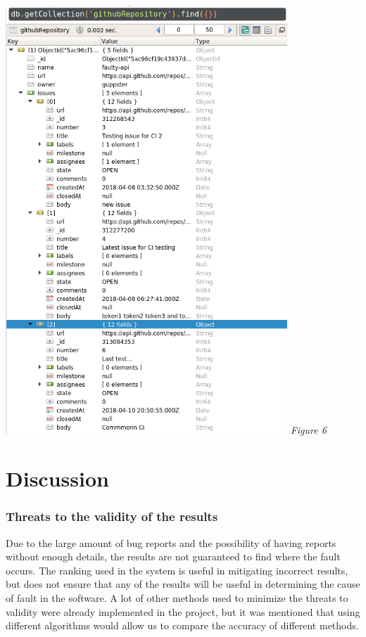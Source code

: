 \documentclass[12pt]{article}
\begin{document}
\includegraphics[width=400px]{../images/Robo3t} \emph{Figure 6}

\section{Discussion}\label{discussion}

\subsubsection{Threats to the validity of the
results}\label{threats-to-the-validity-of-the-results}

Due to the large amount of bug reports and the possibility of having
reports without enough details, the results are not guaranteed to find
where the fault occurs. The ranking used in the system is useful in
mitigating incorrect results, but does not ensure that any of the
results will be useful in determining the cause of fault in the
software. A lot of other methods used to minimize the threats to
validity were already implemented in the project, but it was mentioned
that using different algorithms would allow us to compare the accuracy
of different methods.
\end{document}
